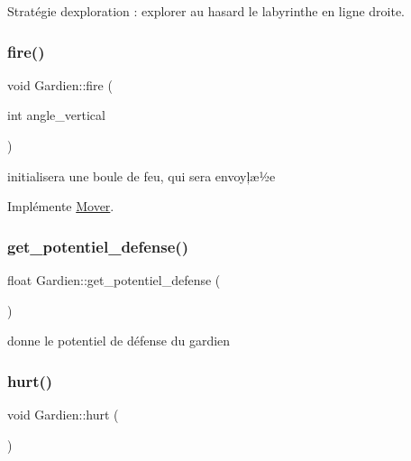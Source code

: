 Stratégie d\textquotesingle{}exploration \+: explorer au hasard le labyrinthe en ligne droite. 

\mbox{\label{classGardien_aa0e2e0fbdca75ddc5e0501b5498d5f55}} 
\subsubsection{\texorpdfstring{fire()}{fire()}}
{\footnotesize\ttfamily void Gardien\+::fire (\begin{DoxyParamCaption}\item[{int}]{angle\+\_\+vertical }\end{DoxyParamCaption})\hspace{0.3cm}{\ttfamily [virtual]}}



initialisera une boule de feu, qui sera envoyļæ½e 



Implémente \hyperlink{classMover_a670fb72f8e496de3420b89c84def7418}{Mover}.

\mbox{\label{classGardien_acb0376cc8fd56e65812e23bf32eaa31c}} 
\subsubsection{\texorpdfstring{get\+\_\+potentiel\+\_\+defense()}{get\_potentiel\_defense()}}
{\footnotesize\ttfamily float Gardien\+::get\+\_\+potentiel\+\_\+defense (\begin{DoxyParamCaption}{ }\end{DoxyParamCaption})\hspace{0.3cm}{\ttfamily [private]}}



donne le potentiel de défense du gardien 

\mbox{\label{classGardien_ac4ba490e309de80c1449fc5baef90390}} 
\subsubsection{\texorpdfstring{hurt()}{hurt()}}
{\footnotesize\ttfamily void Gardien\+::hurt (\begin{DoxyParamCaption}{ }\end{DoxyParamCaption})}



